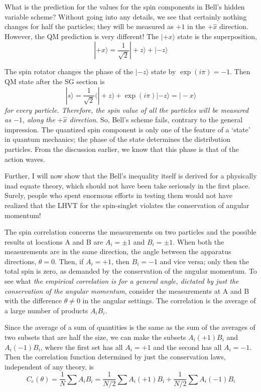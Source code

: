 What is the prediction for the values for the spin components in Bell's hidden variable
scheme? Without going into any details, we see that certainly nothing changes for half the
particles; they will be measured as $+1$ in the $+ \hat{x}$ direction. However, the QM prediction is
very different! The $|+x \rangle$ state is the superposition,
\begin{equation*}
| + x \rangle = \frac{1}{\sqrt{2}} | + z\rangle + | - z \rangle \tag{42}
\end{equation*}

The spin rotator changes the phase of the $|-z \rangle$ state by $\exp(i \pi) = -1$. Then QM state after 
the SG section is
\begin{equation*}
|s \rangle = \frac{1}{\sqrt{2}} (|+z) + \exp (i \pi) | - z \rangle = | - x \rangle \tag{43}
\end{equation*}
\textit{for every particle. Therefore, the spin value of all the particles will be measured as $-1$, along
the $+ \hat{x}$ direction}. So, Bell's scheme fails, contrary to the general impression. The quantized
spin component is only one of the feature of a `state' in quantum mechanics; the phase of
the state determines the distribution particles. From the discussion earlier, we know that
this phase is that of the action waves.

Further, I will now show that the Bell's inequality itself is derived for a physically inad equate theory, which should not have been take seriously in the first place. Surely, people who spent enormous efforts in testing them would not have realized that the LHVT for the
spin-singlet violates the conservation of angular momentum!

The spin correlation concerns the measurements on two particles and the possible results
at locations A and B are $A_i = \pm 1$ and $B_i = \pm 1$. When both the measurements are in the
same direction, the angle between the apparatus directions, $\theta = 0$. Then, if $A_i = +1$, then
$B_i = -1$ and vice versa; only then the total spin is zero, as demanded by the conservation
of the angular momentum. To see what \textit{the empirical correlation is for a general angle,
dictated by just the conservation of the angular momentum}, consider the measurements at
A and B with the difference $\theta \neq 0$ in the angular settings. The correlation is the average of
a large number of products $A_i B_i$.

Since the average of a sum of quantities is the same as the sum of the averages of two
subsets that are half the size, we can make the subsets $A_i (+1)B_i$ and $A_i (-1)B_i$, where the
first set has all $A_i = +1$ and the second has all $A_i = -1$. Then the correlation function
determined by just the conservation laws, independent of any theory, is
$$
C_e (\theta) = \frac{1}{N} \sum A_i B_i = \frac{1}{N/2} \sum A_i (+1) B_i + \frac{1}{N/2} \sum A_i (-1) B_i
$$

